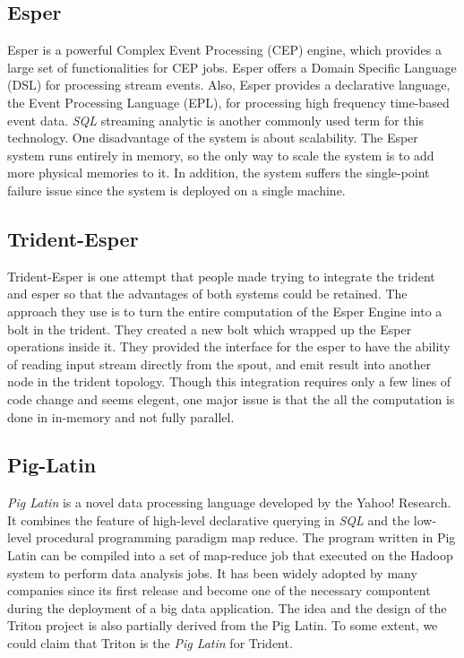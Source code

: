 \documentclass[conference, twocolumn, twoside, 11pt]{IEEEtran}
\theoremstyle{definition}
\begin{document}
\subsection{Esper}
Esper is a powerful Complex Event Processing (CEP) engine, which provides a large set of functionalities for CEP jobs. Esper offers a Domain Specific Language (DSL) for processing stream events.
Also, Esper provides a declarative language, the Event Processing Language (EPL), for processing high frequency time-based event data. \emph{SQL} streaming analytic is another commonly used term for this
technology. One disadvantage of the system is about scalability. The Esper system runs entirely in memory, so the only way to scale the system is to add more physical memories to it. In addition,
the system suffers the single-point failure issue since the system is deployed on a single machine.

\subsection{Trident-Esper}
Trident-Esper is one attempt that people made trying to integrate the trident and esper so that the advantages of both systems could be retained. The approach they use is to turn the entire
computation of the Esper Engine into a bolt in the trident. They created a new bolt which wrapped up the Esper operations inside it. They provided the interface for the esper to have the
ability of reading input stream directly from the spout, and emit result into another node in the trident topology. Though this integration requires only a few lines of code change and seems
elegent, one major issue is that the all the computation is done in in-memory and not fully parallel.

\subsection{Pig-Latin}
\emph{Pig Latin} is a novel data processing language developed by the Yahoo! Research. It combines the feature of high-level declarative querying in \emph{SQL} and the low-level procedural programming
paradigm map reduce. The program written in Pig Latin can be compiled into a set of map-reduce job that executed on the Hadoop system to perform data analysis jobs. It has been widely adopted by
many companies since its first release and become one of the necessary compontent during the deployment of a big data application. The idea and the design of the Triton project is also partially derived
from the Pig Latin. To some extent, we could claim that Triton is the \emph{Pig Latin} for Trident.
\end{document}
